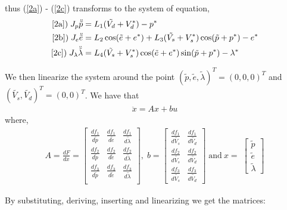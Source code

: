 thus (\ref{2a}) - (\ref{2c}) transforms to the system of equation,
\begin{align*}
\text{\ref{2a})}\;  J_p\ddot{\tilde{p}}                 &= L_1(\tilde{V_d} + V_d^{\ast}) - p^{\ast}\\
\text{\ref{2b})}\;  J_e\ddot{\tilde{e}}                 &= L_2\cos(\tilde{e} + e^{\ast}) + L_3(\tilde{V_s} + V_s^{\ast})\cos(\tilde{p} + p^{\ast}) - e^{\ast}\\
\text{\ref{2c})}\;  J_\lambda\ddot{\tilde{\lambda}}     &= L_4(\tilde{V_s} + V_s^{\ast})\cos(\tilde{e} +                                                                       e^{\ast})\sin(\tilde{p} + p^{\ast}) -\lambda^{\ast}\\
\end{align*}

We then linearize the system around the point $(\tilde{p}, \tilde{e}, \tilde{\lambda})^T = (0, 0, 0)^T$ and $(\tilde{V_s}, \tilde{V_d})^T = (0, 0)^T$. We have that 
\begin{align*}
\ddot{x} = Ax + bu
\end{align*}
where,
\begin{align*}
A =\frac{{d}F}{{d}x} = 
\begin{bmatrix}
    \frac{{d}f_1}{{d}\tilde{p}} & \frac{{d}f_1}{{d}\tilde{e}} & \frac{{d}f_1}{{d}\tilde{\lambda}}\\
    \frac{{d}f_2}{{d}\tilde{p}} & \frac{{d}f_2}{{d}\tilde{e}} & \frac{{d}f_2}{{d}\tilde{\lambda}}\\
    \frac{{d}f_3}{{d}\tilde{p}} & \frac{{d}f_3}{{d}\tilde{e}} & \frac{{d}f_3}{{d}\tilde{\lambda}}\\
\end{bmatrix},\;
b= 
\begin{bmatrix}
    \frac{{d}f_1}{{d}\tilde{V_s}} & \frac{{d}f_1}{{d}\tilde{V_d}}\\
    \frac{{d}f_2}{{d}\tilde{V_s}} & \frac{{d}f_2}{{d}\tilde{V_d}}\\
    \frac{{d}f_3}{{d}\tilde{V_s}} & \frac{{d}f_3}{{d}\tilde{V_d}}
\end{bmatrix} \;
\text{and}\ x =\;
\begin{bmatrix}
    \tilde{p}\\
    \tilde{e}\\
    \tilde{\lambda}
\end{bmatrix}
\end{align*}

By substituting, deriving, inserting and linearizing we get the matrices: 


